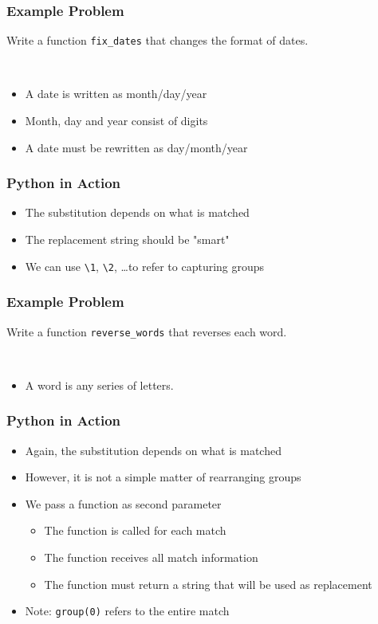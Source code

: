 \begin{frame}
  \frametitle{Example Problem}
  \begin{center}
    Write a function \texttt{fix\_dates} that changes the format of dates.
  \end{center}
  \vskip5mm
  \\[2mm]
  \begin{itemize}
    \item A date is written as month/day/year
    \item Month, day and year consist of digits
    \item A date must be rewritten as day/month/year
  \end{itemize}
\end{frame}

\begin{frame}
  \frametitle{Python in Action}
  \begin{itemize}
    \item The substitution depends on what is matched
    \item The replacement string should be "smart"
    \item We can use \texttt{\textbackslash1}, \texttt{\textbackslash2}, \dots to refer to capturing groups
  \end{itemize}
\end{frame}

\begin{frame}
  \frametitle{Example Problem}
  \begin{center}
    Write a function \texttt{reverse\_words} that reverses each word.
  \end{center}
  \vskip5mm
  \\[2mm]
  \begin{itemize}
    \item A word is any series of letters.
  \end{itemize}
\end{frame}

\begin{frame}
  \frametitle{Python in Action}
  \begin{itemize}
    \item Again, the substitution depends on what is matched
    \item However, it is not a simple matter of rearranging groups
    \item We pass a function as second parameter
      \begin{itemize}
        \item The function is called for each match
        \item The function receives all match information
        \item The function must return a string that will be used as replacement
      \end{itemize}
    \item Note: \texttt{group(0)} refers to the entire match
  \end{itemize}
\end{frame}
